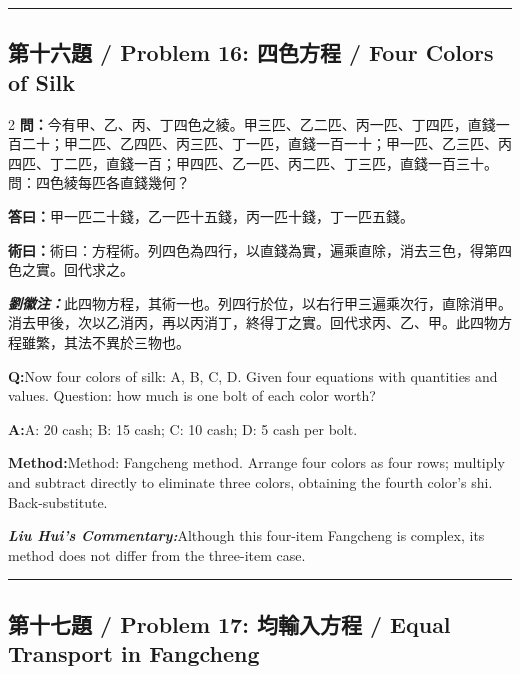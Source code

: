 \documentclass[11pt,a4paper]{article}
\newcommand{\cnwen}{\textcolor{cnlabelfg}{\textbf{問：}}}
\newcommand{\cnda}{\textbf{答曰：}}
\newcommand{\cnshu}{\textcolor{cnlabelfg}{\textbf{術曰：}}}
\newcommand{\cnzhu}{\textcolor{commentarycolor}{\textit{\textbf{劉徽注：}}}}
\newcommand{\enwen}{\textcolor{enlabelfg}{\textbf{Q:}}}
\newcommand{\enda}{\textcolor{enlabelfg}{\textbf{A:}}}
\newcommand{\enshu}{\textcolor{enlabelfg}{\textbf{Method:}}}
\newcommand{\enzhu}{\textcolor{enlabelfg}{\textit{\textbf{Liu Hui's Commentary:}}}}
\begin{document}
\bigskip\hrule\bigskip

\subsection{第十六題 / Problem 16: 四色方程 / Four Colors of Silk}

\begin{paracol}{2}
\switchcolumn[0]
\cnwen 今有甲、乙、丙、丁四色之綾。甲三匹、乙二匹、丙一匹、丁四匹，直錢一百二十；甲二匹、乙四匹、丙三匹、丁一匹，直錢一百一十；甲一匹、乙三匹、丙四匹、丁二匹，直錢一百；甲四匹、乙一匹、丙二匹、丁三匹，直錢一百三十。問：四色綾每匹各直錢幾何？

\cnda 甲一匹二十錢，乙一匹十五錢，丙一匹十錢，丁一匹五錢。

\cnshu 術曰：方程術。列四色為四行，以直錢為實，遍乘直除，消去三色，得第四色之實。回代求之。

\cnzhu 此四物方程，其術一也。列四行於位，以右行甲三遍乘次行，直除消甲。消去甲後，次以乙消丙，再以丙消丁，終得丁之實。回代求丙、乙、甲。此四物方程雖繁，其法不異於三物也。

\switchcolumn[1]
\enwen Now four colors of silk: A, B, C, D. Given four equations with quantities and values. Question: how much is one bolt of each color worth?

\enda A: 20 cash; B: 15 cash; C: 10 cash; D: 5 cash per bolt.

\enshu Method: Fangcheng method. Arrange four colors as four rows; multiply and subtract directly to eliminate three colors, obtaining the fourth color's shi. Back-substitute.

\enzhu Although this four-item Fangcheng is complex, its method does not differ from the three-item case.
\end{paracol}

\bigskip\hrule\bigskip

\subsection{第十七題 / Problem 17: 均輸入方程 / Equal Transport in Fangcheng}
\end{document}
